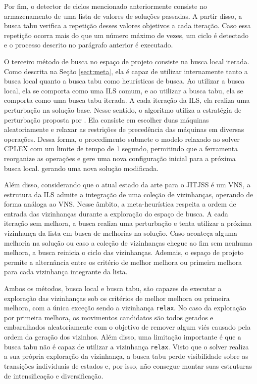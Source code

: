 Por fim, o detector de ciclos mencionado anteriormente consiste no armazenamento de uma lista de valores de soluções passadas. A partir disso, a busca tabu verifica a repetição desses valores objetivos a cada iteração. Caso essa repetição ocorra mais do que um número máximo de vezes, um ciclo é detectado e o processo descrito no parágrafo anterior é executado.

O terceiro método de busca no espaço de projeto consiste na busca local iterada. Como descrita na Seção \ref{sect:meta}, ela é capaz de utilizar internamente tanto a busca local quanto a busca tabu como heurísticas de busca. Ao utilizar a busca local, ela se comporta como uma \ac{ILS} comum, e ao utilizar a busca tabu, ela se comporta como uma busca tabu iterada. A cada iteração da \ac{ILS}, ela realiza uma perturbação na solução base. Nesse sentido, o algoritmo utiliza a estratégia de perturbação proposta por \cite{ahmadian2021meta}. Ela consiste em escolher duas máquinas aleatoriamente e relaxar as restrições de precedência das máquinas em diversas operações. Dessa forma, o procedimento submete o modelo relaxado ao solver CPLEX com um limite de tempo de 1 segundo, permitindo que a ferramenta reorganize as operações e gere uma nova configuração inicial para a próxima busca local. gerando uma nova solução modificada.

Além disso, considerando que o atual estado da arte para o \ac{JITJSS} é um \ac{VNS}, a estrutura da \ac{ILS} admite a integração de uma coleção de vizinhanças, operando de forma análoga ao \ac{VNS}. Nesse âmbito, a meta-heurística respeita a ordem de entrada das vizinhanças durante a exploração do espaço de busca. A cada iteração sem melhora, a busca realiza uma perturbação e tenta utilizar a próxima vizinhança da lista em busca de melhorias na solução. Caso aconteça alguma melhoria na solução ou caso a coleção de vizinhanças chegue ao fim sem nenhuma melhora, a busca reinicia o ciclo das vizinhanças. Ademais, o espaço de projeto permite a alternância entre os critério de melhor melhora ou primeira melhora para cada vizinhança integrante da lista.

Ambos os métodos, busca local e busca tabu, são capazes de executar a exploração das vizinhanças sob os critérios de melhor melhora ou primeira melhora, com a única exceção sendo a vizinhança \texttt{relax}. No caso da exploração por primeira melhora, os movimentos candidatos são todos gerados e embaralhados aleatoriamente com o objetivo de remover algum viés causado pela ordem da geração dos vizinhos. Além disso, uma limitação importante é que a busca tabu não é capaz de utilizar a vizinhança \texttt{relax}. Visto que o solver realiza a sua própria exploração da vizinhança, a busca tabu perde visibilidade sobre as transições individuais de estados e, por isso, não consegue montar suas estruturas de intensificação e diversificação.

